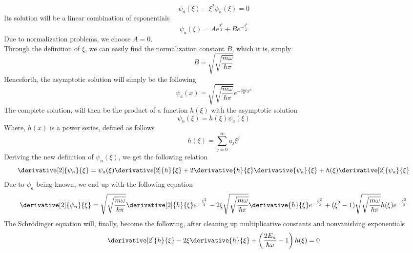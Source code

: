 \documentclass[a4paper, 11pt]{book}
\newcommand{\1}{\opr{\mathds{1}}}
\theoremstyle{plain}
\begin{document}
	\begin{equation*}
		\psi_a(\xi)-\xi^2\psi_a(\xi)=0
	\end{equation*}
	Its solution will be a linear combination of esponentials
	\begin{equation*}
		\psi_a(\xi)=Ae^{\frac{\xi^2}{2}}+Be^{-\frac{\xi^2}{2}}
	\end{equation*}
	Due to normalization problems, we choose $A=0$.\\
	Through the definition of $\xi$, we can easily find the normalization constant $B$, which it is, simply
	\begin{equation*}
		B=\sqrt{\sqrt{\frac{m\omega}{\hbar\pi}}}
	\end{equation*}
	Henceforth, the asymptotic solution will simply be the following
	\begin{equation}
		\psi_a(x)=\sqrt{\sqrt{\frac{m\omega}{\hbar\pi}}}e^{-\frac{m\omega}{\hbar}x^2}
		\label{eq:schrqhoasy}
	\end{equation}
	The complete solution, will then be the product of a function $h(\xi)$ with the asymptotic solution
	\begin{equation}
		\psi_n(\xi)=h(\xi)\psi_a(\xi)
		\label{eq:solcomplete}
	\end{equation}
	Where, $h(x)$ is a power series, defined as follows
	\begin{equation}
		h(\xi)=\sum_{j=0}^{\infty}a_j\xi^j
		\label{eq:hxischrqho}
	\end{equation}
	Deriving the new definition of $\psi_n(\xi)$, we get the following relation
	\begin{equation*}
		\derivative[2]{\psi_n}{\xi}=\psi_a(\xi)\derivative[2]{h}{\xi}+2\derivative{h}{\xi}\derivative{\psi_a}{\xi}+h(\xi)\derivative[2]{\psi_a}{\xi}
	\end{equation*}
	Due to $\psi_a$ being known, we end up with the following equation
	\begin{equation*}
		\derivative[2]{\psi_n}{\xi}=\sqrt{\sqrt{\frac{m\omega}{\hbar\pi}}}\derivative[2]{h}{\xi}e^{-\frac{\xi^2}{2}}-2\xi\sqrt{\sqrt{\frac{m\omega}{\hbar\pi}}}\derivative{h}{\xi}e^{-\frac{\xi^2}{2}}+(\xi^2-1)\sqrt{\sqrt{\frac{m\omega}{\hbar\pi}}}h(\xi)e^{-\frac{\xi^2}{2}}
	\end{equation*}
	The Schrödinger equation will, finally, become the following, after cleaning up multiplicative constants and nonvanishing exponentials
	\begin{equation}
		\derivative[2]{h}{\xi}-2\xi\derivative{h}{\xi}+\left( \frac{2E_n}{\hbar\omega}-1 \right)h(\xi)=0
		\label{eq:schrqhohxi}
	\end{equation}
\end{document}
